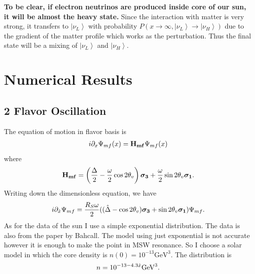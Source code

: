 \documentclass[letterpaper,12pt,english]{sphinxmanual}
\newcommand{\ket}[1]{\left| #1\right\rangle}
\begin{document}
\textbf{To be clear, if electron neutrinos are produced inside core of our sun, it will be almost the heavy state.} Since the interaction with matter is very strong, it transfers to \(\ket{\nu_L}\) with probability \(P(x\to \infty, \ket{\nu_L}\to\ket{\nu_H})\) due to the gradient of the matter profile which works as the perturbation. Thus the final state will be a mixing of \(\ket{\nu_L}\) and \(\ket{\nu_H}\).


\section{Numerical Results}
\label{msw:numerical-results}

\subsection{2 Flavor Oscillation}
\label{msw:flavor-oscillation}
The equation of motion in flavor basis is
\begin{gather}
\begin{split}i\partial_x \Psi_{mf}(x) = \mathbf{H_{mf}} \Psi_{mf}(x)\end{split}\notag
\end{gather}
where
\begin{gather}
\begin{split}\mathbf{H_{mf}} =  \left(  \frac{\Delta}{2} -  \frac{\omega}{2} \cos 2\theta_v  \right) \boldsymbol{\sigma_3} + \frac{\omega}{2} \sin 2\theta_v \boldsymbol{\sigma_1}.\end{split}\notag
\end{gather}
Writing down the dimensionless equation, we have
\begin{gather}
\begin{split}i \partial_{\hat x} \Psi_{mf} = \frac{R_S \omega}{2} ( (\hat\Delta - \cos 2\theta_v ) \boldsymbol{\sigma_3} + \sin 2\theta_v \boldsymbol{\sigma_1} )  \Psi_{mf} .\end{split}\notag
\end{gather}
As for the data of the sun I use a simple exponential distribution. The data is also from the paper by Bahcall. The model using just exponential is not accurate however it is enough to make the point in MSW resonance. So I choose a solar model in which the core density is \(n(0) = 10^{-13}\mathrm{GeV}^{3}\). The distribution is
\begin{gather}
\begin{split}n =  10^{-13 - 4.3\hat x} \mathrm{GeV}^{3}.\end{split}\notag
\end{gather}
\end{document}
